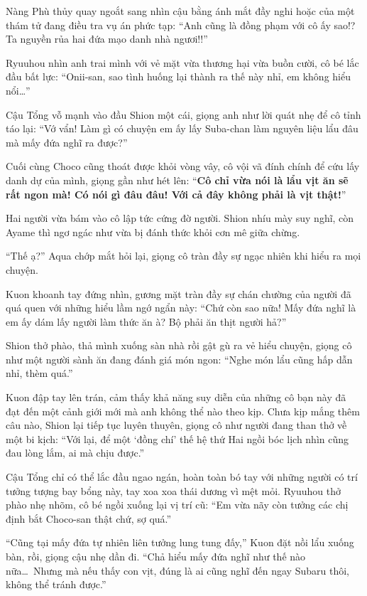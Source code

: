 \documentclass[../main.tex]{subfiles}
\begin{document}
Nàng Phù thủy quay ngoắt sang nhìn cậu bằng ánh mắt đầy nghi hoặc của một thám tử đang điều tra vụ án phức tạp: ``Anh cũng là đồng phạm với cô ấy sao!? Ta nguyền rủa hai đứa mạo danh nhà ngươi!!''

Ryuuhou nhìn anh trai mình với vẻ mặt vừa thương hại vừa buồn cười, cô bé lắc đầu bất lực: ``Onii-san, sao tình huống lại thành ra thế này nhỉ, em không hiểu nổi\dots''

Cậu Tổng vỗ mạnh vào đầu Shion một cái, giọng anh như lời quát nhẹ để cô tỉnh táo lại: ``Vớ vẩn! Làm gì có chuyện em ấy lấy Suba-chan làm nguyên liệu lẩu đâu mà mấy đứa nghĩ ra được?''

Cuối cùng Choco cũng thoát được khỏi vòng vây, cô vội vã đính chính để cứu lấy danh dự của mình, giọng gần như hét lên: ``\textbf{Cô chỉ vừa nói là lẩu vịt ăn sẽ rất ngon mà! Có nói gì đâu đâu! Với cả đây không phải là vịt thật!}''

Hai người vừa bám vào cô lập tức cứng đờ người. Shion nhíu mày suy nghĩ, còn Ayame thì ngơ ngác như vừa bị đánh thức khỏi cơn mê giữa chừng.

``Thế ạ?'' Aqua chớp mắt hỏi lại, giọng cô tràn đầy sự ngạc nhiên khi hiểu ra mọi chuyện.

Kuon khoanh tay đứng nhìn, gương mặt tràn đầy sự chán chường của người đã quá quen với những hiểu lầm ngớ ngẩn này: ``Chứ còn sao nữa! Mấy đứa nghĩ là em ấy dám lấy người làm thức ăn à? Bộ phải ăn thịt người hả?''

Shion thở phào, thả mình xuống sàn nhà rồi gật gù ra vẻ hiểu chuyện, giọng cô như một người sành ăn đang đánh giá món ngon: ``Nghe món lẩu cũng hấp dẫn nhỉ, thèm quá.''

Kuon đập tay lên trán, cảm thấy khả năng suy diễn của những cô bạn này đã đạt đến một cảnh giới mới mà anh không thể nào theo kịp. Chưa kịp mắng thêm câu nào, Shion lại tiếp tục luyên thuyên, giọng cô như người đang than thở về một bi kịch: ``Với lại, để một `đồng chí' thế hệ thứ Hai ngồi bóc lịch nhìn cũng đau lòng lắm, ai mà chịu được.''

Cậu Tổng chỉ có thể lắc đầu ngao ngán, hoàn toàn bó tay với những người có trí tưởng tượng bay bổng này, tay xoa xoa thái dương vì mệt mỏi. Ryuuhou thở phào nhẹ nhõm, cô bé ngồi xuống lại vị trí cũ: ``Em vừa nãy còn tưởng các chị định bắt Choco-san thật chứ, sợ quá.''

``Cũng tại mấy đứa tự nhiên liên tưởng lung tung đấy,'' Kuon đặt nồi lẩu xuống bàn, rồi, giọng cậu nhẹ dần đi. ``Chả hiểu mấy đứa nghĩ như thế nào nữa\dots\ Nhưng mà nếu thấy con vịt, đúng là ai cũng nghĩ đến ngay Subaru thôi, không thể tránh được.''
\end{document}
